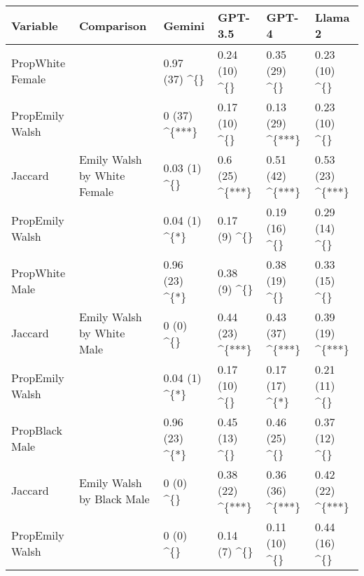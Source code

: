 \begin{table}
\centering\begingroup\fontsize{7}{9}\selectfont

\begin{tabular}{llllll}
\toprule
Variable & Comparison & Gemini & GPT-3.5 & GPT-4 & Llama 2\\
\midrule
PropWhite Female &  & 0.97 (37) \textasciicircum{}\{\} & 0.24 (10) \textasciicircum{}\{\} & 0.35 (29) \textasciicircum{}\{\} & 0.23 (10) \textasciicircum{}\{\}\\

PropEmily Walsh &  & 0 (37) \textasciicircum{}\{***\} & 0.17 (10) \textasciicircum{}\{\} & 0.13 (29) \textasciicircum{}\{***\} & 0.23 (10) \textasciicircum{}\{\}\\

Jaccard & \multirow{-3}{*}{\raggedright\arraybackslash Emily Walsh by White Female} & 0.03 (1) \textasciicircum{}\{\} & 0.6 (25) \textasciicircum{}\{***\} & 0.51 (42) \textasciicircum{}\{***\} & 0.53 (23) \textasciicircum{}\{***\}\\
\cmidrule{1-6}
PropEmily Walsh &  & 0.04 (1) \textasciicircum{}\{*\} & 0.17 (9) \textasciicircum{}\{\} & 0.19 (16) \textasciicircum{}\{\} & 0.29 (14) \textasciicircum{}\{\}\\

PropWhite Male &  & 0.96 (23) \textasciicircum{}\{*\} & 0.38 (9) \textasciicircum{}\{\} & 0.38 (19) \textasciicircum{}\{\} & 0.33 (15) \textasciicircum{}\{\}\\

Jaccard & \multirow{-3}{*}{\raggedright\arraybackslash Emily Walsh by White Male} & 0 (0) \textasciicircum{}\{\} & 0.44 (23) \textasciicircum{}\{***\} & 0.43 (37) \textasciicircum{}\{***\} & 0.39 (19) \textasciicircum{}\{***\}\\
\cmidrule{1-6}
PropEmily Walsh &  & 0.04 (1) \textasciicircum{}\{*\} & 0.17 (10) \textasciicircum{}\{\} & 0.17 (17) \textasciicircum{}\{*\} & 0.21 (11) \textasciicircum{}\{\}\\

PropBlack Male &  & 0.96 (23) \textasciicircum{}\{*\} & 0.45 (13) \textasciicircum{}\{\} & 0.46 (25) \textasciicircum{}\{\} & 0.37 (12) \textasciicircum{}\{\}\\

Jaccard & \multirow{-3}{*}{\raggedright\arraybackslash Emily Walsh by Black Male} & 0 (0) \textasciicircum{}\{\} & 0.38 (22) \textasciicircum{}\{***\} & 0.36 (36) \textasciicircum{}\{***\} & 0.42 (22) \textasciicircum{}\{***\}\\
\cmidrule{1-6}
PropEmily Walsh &  & 0 (0) \textasciicircum{}\{\} & 0.14 (7) \textasciicircum{}\{\} & 0.11 (10) \textasciicircum{}\{\} & 0.44 (16) \textasciicircum{}\{\}\\


\end{tabular}
\end{table}
